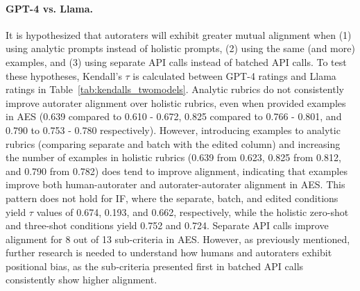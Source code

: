 \paragraph{GPT-4 vs. Llama.}It is hypothesized that autoraters will exhibit greater mutual alignment  when (1) using analytic prompts instead of holistic prompts, (2) using the same (and more) examples, and (3) using separate API calls instead of batched API calls. To test these hypotheses, Kendall's $\tau$ is calculated between GPT-4 ratings and Llama ratings in Table~\ref{tab:kendalls_twomodels}. Analytic rubrics do not consistently improve autorater alignment over holistic rubrics, even when provided examples in AES (0.639 compared to 0.610 - 0.672, 0.825 compared to 0.766 - 0.801, and 0.790 to 0.753 - 0.780 respectively). However, introducing examples to analytic rubrics (comparing separate and batch with the edited column) and increasing the number of examples in holistic rubrics (0.639 from 0.623, 0.825 from 0.812, and 0.790 from 0.782) does tend to improve alignment, indicating that examples improve both human-autorater and autorater-autorater alignment in AES. This pattern does not hold for IF, where the separate, batch, and edited conditions yield $\tau$ values of 0.674, 0.193, and 0.662, respectively, while the holistic zero-shot and three-shot conditions yield 0.752 and 0.724. Separate API calls improve alignment for 8 out of 13 sub-criteria in AES. However, as previously mentioned, further research is needed to understand  how humans and autoraters exhibit positional bias, as the sub-criteria presented first in batched API calls consistently show higher alignment.